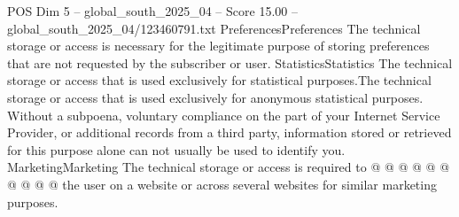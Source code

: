 \begin{textsample}{POS Dim 5 – global\_south\_2025\_04 – Score 15.00 – global\_south\_2025\_04/123460791.txt}
PreferencesPreferences The technical storage or access is necessary for the legitimate purpose of storing preferences that are not requested by the subscriber or user.
StatisticsStatistics The technical storage or access that is used exclusively for statistical purposes.The technical storage or access that is used exclusively for anonymous statistical purposes.
Without a subpoena, voluntary compliance on the part of your Internet Service Provider, or additional records from a third party, information stored or retrieved for this purpose alone can not usually be used to identify you.
MarketingMarketing The technical storage or access is required to @ @ @ @ @ @ @ @ @ @ the user on a website or across several websites for similar marketing purposes.

\end{textsample}
